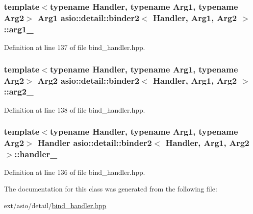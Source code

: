 \subsubsection[{arg1\+\_\+}]{\setlength{\rightskip}{0pt plus 5cm}template$<$typename Handler, typename Arg1, typename Arg2$>$ Arg1 {\bf asio\+::detail\+::binder2}$<$ Handler, Arg1, Arg2 $>$\+::arg1\+\_\+}\label{classasio_1_1detail_1_1binder2_ad03c34f96ee8956653cb24dc56ecead4}


Definition at line 137 of file bind\+\_\+handler.\+hpp.

\hypertarget{classasio_1_1detail_1_1binder2_a4e200aef85dfd3813938c5e3364cdd2e}{}
\subsubsection[{arg2\+\_\+}]{\setlength{\rightskip}{0pt plus 5cm}template$<$typename Handler, typename Arg1, typename Arg2$>$ Arg2 {\bf asio\+::detail\+::binder2}$<$ Handler, Arg1, Arg2 $>$\+::arg2\+\_\+}\label{classasio_1_1detail_1_1binder2_a4e200aef85dfd3813938c5e3364cdd2e}


Definition at line 138 of file bind\+\_\+handler.\+hpp.

\hypertarget{classasio_1_1detail_1_1binder2_a1443f32c77da165b216af1d1ae7a42fd}{}
\subsubsection[{handler\+\_\+}]{\setlength{\rightskip}{0pt plus 5cm}template$<$typename Handler, typename Arg1, typename Arg2$>$ Handler {\bf asio\+::detail\+::binder2}$<$ Handler, Arg1, Arg2 $>$\+::handler\+\_\+}\label{classasio_1_1detail_1_1binder2_a1443f32c77da165b216af1d1ae7a42fd}


Definition at line 136 of file bind\+\_\+handler.\+hpp.



The documentation for this class was generated from the following file\+:\begin{DoxyCompactItemize}
\item 
ext/asio/detail/\hyperlink{bind__handler_8hpp}{bind\+\_\+handler.\+hpp}\end{DoxyCompactItemize}
